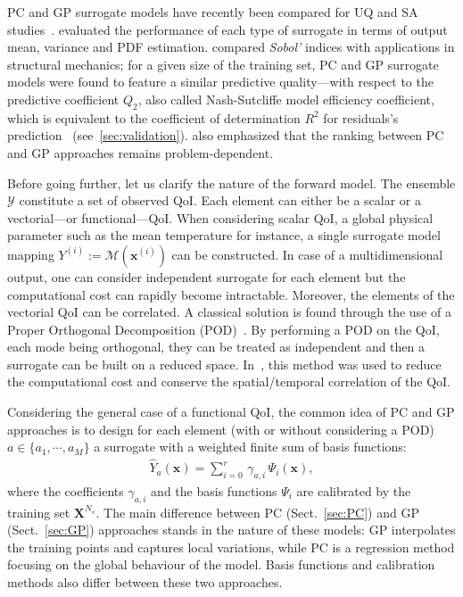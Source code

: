 PC and GP surrogate models have recently been compared for UQ and SA studies~\citep{legratiet2017,owen2015,schoebi2015}. \citet{owen2015} evaluated the performance of each type of surrogate in terms of output mean, variance and PDF estimation. \citet{legratiet2017} compared \emph{Sobol'} indices with applications in structural mechanics; for a given size of the training set, PC and GP surrogate models were found to feature a similar predictive quality---with respect to the predictive coefficient $Q_2$, also called Nash-Sutcliffe model efficiency coefficient, which is equivalent to the coefficient of determination $R^2$ for residuals's prediction~\citep{krause2005} (see~\cref{sec:validation}). \citet{legratiet2017} also emphasized that the ranking between PC and GP approaches remains problem-dependent.

Before going further, let us clarify the nature of the forward model. The ensemble $\mathcal{Y}$ constitute a set of observed QoI. Each element can either be a scalar or a vectorial---or functional---QoI. When considering scalar QoI, a global physical parameter such as the mean temperature for instance, a single surrogate model mapping $Y^{(i)} := \mathcal{M}(\mathbf{x}^{(i)})$ can be constructed. In case of a multidimensional output, one can consider independent surrogate for each element but the computational cost can rapidly become intractable. Moreover, the elements of the vectorial QoI can be correlated. A classical solution is found through the use of a Proper Orthogonal Decomposition (POD)~\cite{AnindyaChatterjee2000}. By performing a POD on the QoI, each mode being orthogonal, they can be treated as independent and then a surrogate can be built on a reduced space. In~\cite{braconnier2011,margheri2016}, this method was used to reduce the computational cost and conserve the spatial/temporal correlation of the QoI.

Considering the general case of a functional QoI, the common idea of PC and GP approaches is to design for each element (with or without considering a POD) $a \in \{a_1, \cdots, a_M\}$ a surrogate with a weighted finite sum of basis functions:
\begin{align}
\widehat{Y}_a\left(\mathbf{x}\right) = \displaystyle\sum_{i = 0}^{r}\,\gamma_{a,i}\,\Psi_{i}\left(\mathbf{x}\right),
\label{eq:SurrogateForm}
\end{align}
where the coefficients $\gamma_{a,i}$ and the basis functions $\Psi_i$ are calibrated by the training set $\mathbf{X}^{N_s}$. The main difference between PC (Sect.~\ref{sec:PC}) and GP (Sect.~\ref{sec:GP}) approaches stands in the nature of these models: GP interpolates the training points and captures local variations, while PC is a regression method focusing on the global behaviour of the model. Basis functions and calibration methods also differ between these two approaches.

